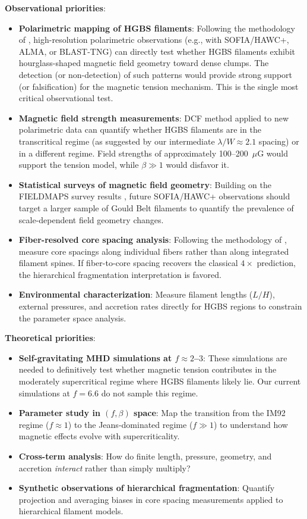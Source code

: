 \documentclass[11pt,a4paper]{article}
\begin{document}
\textbf{Observational priorities}:
\begin{itemize}
    \item \textbf{Polarimetric mapping of HGBS filaments}: Following the methodology of \citet{Jadhav2026}, high-resolution polarimetric observations (e.g., with SOFIA/HAWC+, ALMA, or BLAST-TNG) can directly test whether HGBS filaments exhibit hourglass-shaped magnetic field geometry toward dense clumps. The detection (or non-detection) of such patterns would provide strong support (or falsification) for the magnetic tension mechanism. This is the single most critical observational test.
    \item \textbf{Magnetic field strength measurements}: DCF method applied to new polarimetric data can quantify whether HGBS filaments are in the transcritical regime (as suggested by our intermediate $\lambda/W \approx 2.1$ spacing) or in a different regime. Field strengths of approximately 100--200~$\mu$G would support the tension model, while $\beta \gg 1$ would disfavor it.
    \item \textbf{Statistical surveys of magnetic field geometry}: Building on the FIELDMAPS survey results \citep{Coude2025}, future SOFIA/HAWC+ observations should target a larger sample of Gould Belt filaments to quantify the prevalence of scale-dependent field geometry changes.
    \item \textbf{Fiber-resolved core spacing analysis}: Following the methodology of \citet{Yang2024}, measure core spacings along individual fibers rather than along integrated filament spines. If fiber-to-core spacing recovers the classical $4\times$ prediction, the hierarchical fragmentation interpretation is favored.
    \item \textbf{Environmental characterization}: Measure filament lengths ($L/H$), external pressures, and accretion rates directly for HGBS regions to constrain the parameter space analysis.
\end{itemize}

\textbf{Theoretical priorities}:
\begin{itemize}
    \item \textbf{Self-gravitating MHD simulations at $f \approx 2$--$3$}: These simulations are needed to definitively test whether magnetic tension contributes in the moderately supercritical regime where HGBS filaments likely lie. Our current simulations at $f = 6.6$ do not sample this regime.
    \item \textbf{Parameter study in $(f, \beta)$ space}: Map the transition from the IM92 regime ($f \approx 1$) to the Jeans-dominated regime ($f \gg 1$) to understand how magnetic effects evolve with supercriticality.
    \item \textbf{Cross-term analysis}: How do finite length, pressure, geometry, and accretion \textit{interact} rather than simply multiply?
    \item \textbf{Synthetic observations of hierarchical fragmentation}: Quantify projection and averaging biases in core spacing measurements applied to hierarchical filament models.
\end{itemize}
\end{document}
